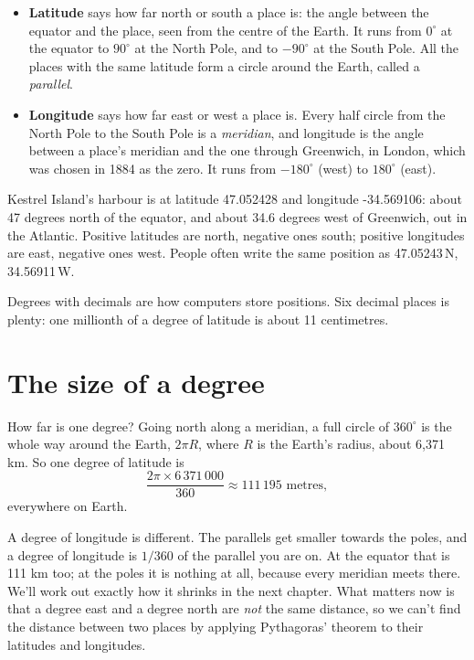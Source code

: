 \begin{itemize}
  \item \textbf{Latitude} says how far north or south a place is: the angle
    between the equator and the place, seen from the centre of the Earth.
    It runs from $0^\circ$ at the equator to $90^\circ$ at the North Pole,
    and to $-90^\circ$ at the South Pole. All the places with the same
    latitude form a circle around the Earth, called a \emph{parallel}.
  \item \textbf{Longitude} says how far east or west a place is. Every
    half circle from the North Pole to the South Pole is a
    \emph{meridian}, and longitude is the angle between a place's meridian
    and the one through Greenwich, in London, which was chosen in 1884 as
    the zero. It runs from $-180^\circ$ (west) to $180^\circ$ (east).
\end{itemize}

Kestrel Island's harbour is at latitude 47.052428 and longitude
-34.569106: about 47 degrees north of the equator, and about 34.6 degrees
west of Greenwich, out in the Atlantic. Positive latitudes are north,
negative ones south; positive longitudes are east, negative ones west.
People often write the same position as 47.05243\,N, 34.56911\,W.

Degrees with decimals are how computers store positions. Six decimal
places is plenty: one millionth of a degree of latitude is about 11
centimetres.

\section{The size of a degree}

How far is one degree? Going north along a meridian, a full circle of
$360^\circ$ is the whole way around the Earth, $2\pi R$, where $R$ is the
Earth's radius, about 6,371 km. So one degree of latitude is
\[
  \frac{2\pi \times 6\,371\,000}{360} \approx 111\,195 \text{ metres},
\]
everywhere on Earth.

A degree of longitude is different. The parallels get smaller towards the
poles, and a degree of longitude is $1/360$ of the parallel you are on. At
the equator that is 111 km too; at the poles it is nothing at all, because
every meridian meets there. We'll work out exactly how it shrinks in the
next chapter. What matters now is that a degree east and a degree north are
\emph{not} the same distance, so we can't find the distance between two
places by applying Pythagoras' theorem to their latitudes and longitudes.

